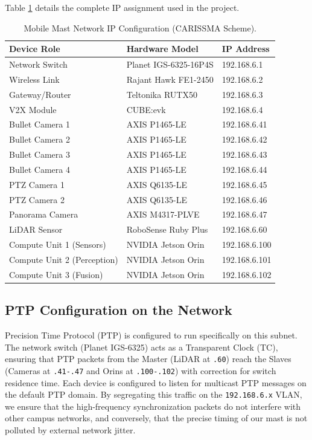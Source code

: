 \documentclass[12pt,a4paper]{report}
\begin{document}
Table \ref{tab:network-ips} details the complete IP assignment used in the project.

\begin{table}[H]
\centering
\caption[Network IP Configuration]{Mobile Mast Network IP Configuration (CARISSMA Scheme).}
\label{tab:network-ips}
\begin{tabular}{l l l}
\toprule
\textbf{Device Role} & \textbf{Hardware Model} & \textbf{IP Address} \\
\midrule
Network Switch & Planet IGS-6325-16P4S & 192.168.6.1 \\
Wireless Link & Rajant Hawk FE1-2450 & 192.168.6.2 \\
Gateway/Router & Teltonika RUTX50 & 192.168.6.3 \\
V2X Module & CUBE:evk & 192.168.6.4 \\
\midrule
Bullet Camera 1 & AXIS P1465-LE & 192.168.6.41 \\
Bullet Camera 2 & AXIS P1465-LE & 192.168.6.42 \\
Bullet Camera 3 & AXIS P1465-LE & 192.168.6.43 \\
Bullet Camera 4 & AXIS P1465-LE & 192.168.6.44 \\
PTZ Camera 1 & AXIS Q6135-LE & 192.168.6.45 \\
PTZ Camera 2 & AXIS Q6135-LE & 192.168.6.46 \\
Panorama Camera & AXIS M4317-PLVE & 192.168.6.47 \\
\midrule
LiDAR Sensor & RoboSense Ruby Plus & 192.168.6.60 \\
\midrule
Compute Unit 1 (Sensors) & NVIDIA Jetson Orin & 192.168.6.100 \\
Compute Unit 2 (Perception) & NVIDIA Jetson Orin & 192.168.6.101 \\
Compute Unit 3 (Fusion) & NVIDIA Jetson Orin & 192.168.6.102 \\
\bottomrule
\end{tabular}
\end{table}

\subsection{PTP Configuration on the Network}
Precision Time Protocol (PTP) is configured to run specifically on this subnet. The network switch (Planet IGS-6325) acts as a Transparent Clock (TC), ensuring that PTP packets from the Master (LiDAR at \texttt{.60}) reach the Slaves (Cameras at \texttt{.41-.47} and Orins at \texttt{.100-.102}) with correction for switch residence time. 
Each device is configured to listen for multicast PTP messages on the default PTP domain. By segregating this traffic on the \texttt{192.168.6.x} VLAN, we ensure that the high-frequency synchronization packets do not interfere with other campus networks, and conversely, that the precise timing of our mast is not polluted by external network jitter.
\end{document}
